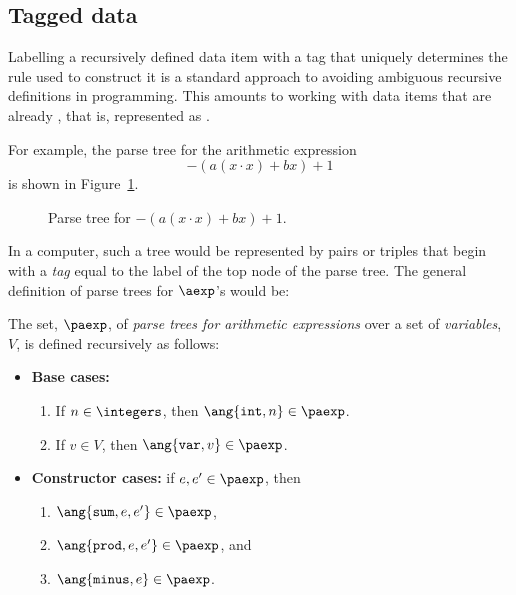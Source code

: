 \begin{editingnotes}

\section{Tagged data}

Labelling a recursively defined data item with a tag that uniquely
determines the rule used to construct it is a standard approach to
avoiding ambiguous recursive definitions in programming.  This
amounts to working with data items that are already , that
is, represented as .

For example, the parse tree for the arithmetic expression
\begin{equation}\label{ax}
-(a(x\cdot x)+ bx) + 1
\end{equation}
is shown in Figure~\ref{fig:parse}.

\begin{figure}[htbp]


\caption{Parse tree for $-(a(x\cdot x)+ bx) + 1$.}
\label{fig:parse}
\end{figure}

In a computer, such a tree would be represented by pairs or triples
that begin with a
\emph{tag} equal to the label of the top node of the parse tree.  
The general definition of parse trees for $\aexp$'s would be:

\begin{definition}\label{arithparse}
The set, $\paexp$, of \emph{parse trees for arithmetic expressions} 
over a set of
\emph{variables}, $V$, is defined recursively as follows:
\begin{itemize}
\item \textbf{Base cases:}
\begin{enumerate}
\item If $n \in \integers$, then $\ang{\texttt{int}, n} \in \paexp$.
\item If $v \in V$, then $\ang{\texttt{var}, v} \in \paexp$.
\end{enumerate}
\item \textbf{Constructor cases:} if $e,e' \in \paexp$, then
\begin{enumerate}
\item $\ang{\texttt{sum}, e, e'} \in \paexp$,
\item $\ang{\texttt{prod}, e, e'} \in \paexp$, and
\item $\ang{\texttt{minus}, e} \in \paexp$.
\end{enumerate}
\end{itemize}
\end{definition}


\end{editingnotes}
